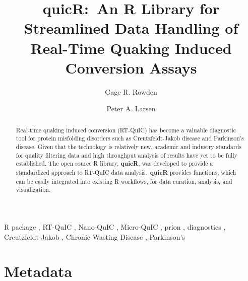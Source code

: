 \documentclass[preprint,12pt,a4paper]{elsarticle}
\begin{document}
    \renewcommand{\labelenumii}{\arabic{enumi}.\arabic{enumii}}

    \begin{frontmatter}

        \title{\textbf{quicR}:\ An R Library for Streamlined Data Handling of Real-Time Quaking Induced Conversion Assays}
        \author[label1,label2,label3]{Gage R. Rowden}
        \author[label1,label2,label3]{Peter A. Larsen}
        \address[label1]{Department of Veterinary and Biomedical Sciences, University of Minnesota, USA.}
        \address[label2]{Minnesota Center for Prion Research and Outreach, University of Minnesota, USA.}
        \address[label3]{Priogen Corp., USA.}

        \begin{abstract}
            Real-time quaking induced conversion (RT-QuIC) has become a valuable diagnostic tool for protein misfolding disorders such as Creutzfeldt-Jakob disease and Parkinson's disease. Given that the technology is relatively new, academic and industry standards for quality filtering data and high throughput analysis of results have yet to be fully established. The open source R library, \textbf{quicR}, was developed to provide a standardized approach to RT-QuIC data analysis.\ \textbf{quicR} provides functions, which can be easily integrated into existing R workflows, for data curation, analysis, and visualization.
        \end{abstract}

        \begin{keyword}
            R package \sep{} RT-QuIC \sep{} Nano-QuIC \sep{} Micro-QuIC \sep{} prion \sep{} diagnostics \sep{} Creutzfeldt-Jakob \sep{} Chronic Wasting Disease \sep{} Parkinson's
        \end{keyword}

    \end{frontmatter}


    \section*{Metadata}
\end{document}
